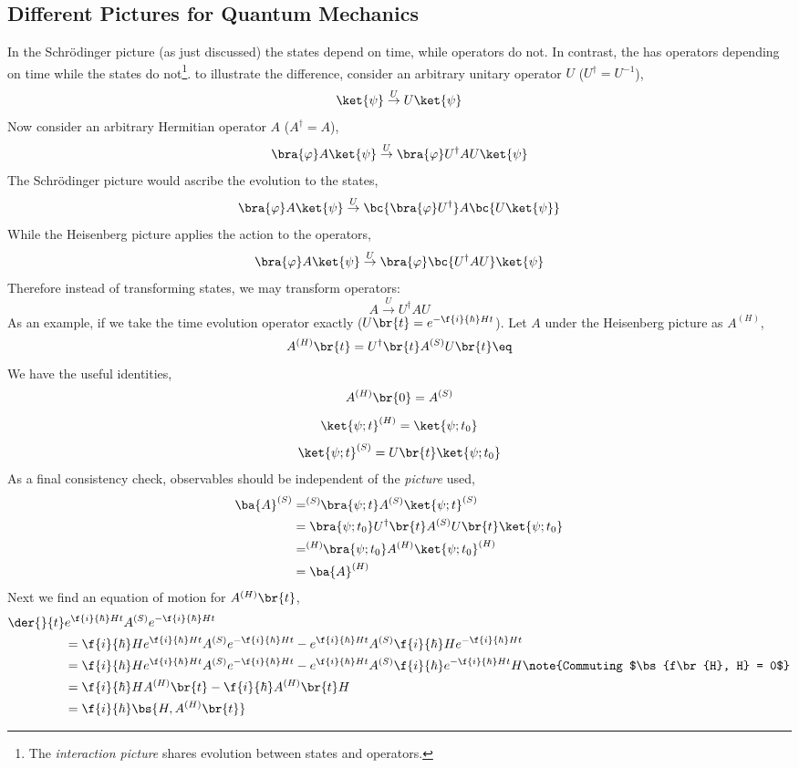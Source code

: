 \documentclass{article}
\begin{document}
\subsection{Different Pictures for Quantum Mechanics}
In the Schrödinger picture (as just discussed) the states depend on time, while operators do not. In contrast, the  has operators depending on time while the states do not\footnote{The \textit{interaction picture} shares evolution between states and operators.}. to illustrate the difference, consider an arbitrary unitary operator $U$ ($U^{\dagger} = U^{-1}$),
\[ \ket{\psi} \stackrel{U}{\to} U\ket{\psi} \]
Now consider an arbitrary Hermitian operator $A$ ($A^{\dagger} = A$),
\[ \bra{\varphi} A \ket{\psi} \stackrel{U}{\to} \bra{\varphi} U^{\dagger}A U\ket{\psi} \]
The Schrödinger picture would ascribe the evolution to the states,
\[ \bra{\varphi} A \ket{\psi} \stackrel{U}{\to} \bc{\bra{\varphi} U^{\dagger}}A \bc{U\ket{\psi}} \]
While the Heisenberg picture applies the action to the operators,
\[ \bra{\varphi} A \ket{\psi} \stackrel{U}{\to} \bra{\varphi} \bc{U^{\dagger}A U}\ket{\psi} \]
Therefore instead of transforming states, we may transform operators:
\[ A \stackrel{U}{\to} U^{\dagger} A U \]
As an example, if we take the time evolution operator exactly ($U\br{t} = e^{-\f{i}{\hbar} H t}$). Let $A$ under the Heisenberg picture as $A^{(H)}$,
\[ A^{(H)}\br{t} = U^{\dagger}\br{t} A^{(S)} U\br{t} \eq \label{eq:HS}\]
We have the useful identities,
\[ A^{(H)}\br{0} = A^{(S)} \]
\[ \ket{\psi; t}^{(H)} = \ket{\psi; t_0} \]
\[ \ket{\psi; t}^{(S)} = U\br{t}\ket{\psi; t_0} \]
As a final consistency check, observables should be independent of the \textit{picture} used,
\begin{align*}
    \ba{A}^{(S)} &= ^{(S)}\!\!\bra{\psi;t} A^{(S)} \ket{\psi;t}^{(S)} \\
     &= \bra{\psi;t_0} U^{\dagger}\br{t}A^{(S)}U\br{t} \ket{\psi;t_0} \\
    &= ^{(H)}\!\!\bra{\psi;t_0} A^{(H)} \ket{\psi;t_0}^{(H)} \\
    &= \ba{A}^{(H)}
\end{align*}
Next we find an equation of motion for $A^{(H)}\br{t}$,
\begin{align*}
    \der{}{t} &e^{\f{i}{\hbar} H t}A^{(S)}e^{-\f{i}{\hbar} H t} \\
    &= \f{i}{\hbar} H e^{\f{i}{\hbar} H t}A^{(S)}e^{-\f{i}{\hbar} H t} - e^{\f{i}{\hbar} H t}A^{(S)} \f{i}{\hbar}He^{-\f{i}{\hbar} H t} \\
    &= \f{i}{\hbar} H e^{\f{i}{\hbar} H t}A^{(S)}e^{-\f{i}{\hbar} H t} - e^{\f{i}{\hbar} H t}A^{(S)} \f{i}{\hbar}e^{-\f{i}{\hbar} H t} H \note{Commuting $\bs{f\br{H}, H} = 0$} \\
    &= \f{i}{\hbar} H A^{(H)}\br{t} - \f{i}{\hbar} A^{(H)}\br{t} H  \\
    &= \f{i}{\hbar} \bs{H, A^{(H)}\br{t}}
\end{align*}
\end{document}
